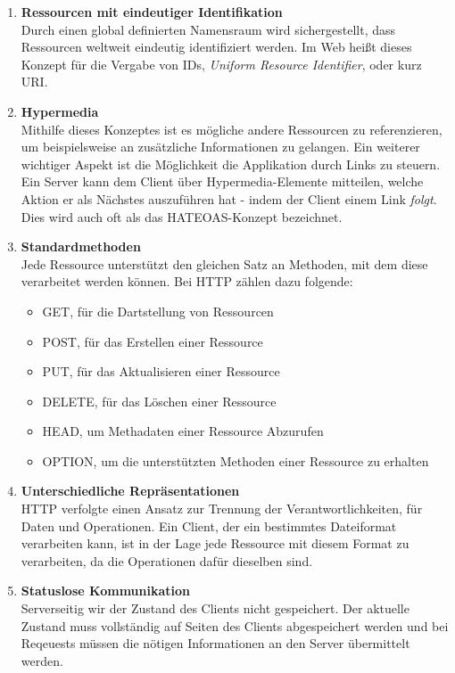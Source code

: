 \begin{enumerate}
	\item \textbf{Ressourcen mit eindeutiger Identifikation}\\
	Durch einen global definierten Namensraum wird sichergestellt, dass Ressourcen weltweit eindeutig identifiziert werden. Im Web heißt dieses Konzept für die Vergabe von IDs, \textit{Uniform Resource Identifier}, oder kurz URI. 
	
	\item \textbf{Hypermedia}\\
	Mithilfe dieses Konzeptes ist es mögliche andere Ressourcen zu referenzieren, um beispielsweise an zusätzliche Informationen zu gelangen. Ein weiterer wichtiger Aspekt ist die Möglichkeit die Applikation durch Links zu steuern. Ein Server kann dem Client über Hypermedia-Elemente mitteilen, welche Aktion er als Nächstes auszuführen hat - indem der Client einem Link \textit{folgt}. Dies wird auch oft als das \acrfull{HATEOAS}-Konzept bezeichnet. 
	
	\item \textbf{Standardmethoden}\\
	Jede Ressource unterstützt den gleichen Satz an Methoden, mit dem diese verarbeitet werden können. Bei HTTP zählen dazu folgende:
	\begin{itemize}
		\item GET, für die Dartstellung von Ressourcen
		\item POST, für das Erstellen einer Ressource
		\item PUT, für das Aktualisieren einer Ressource
		\item DELETE, für das Löschen einer Ressource
		\item HEAD, um Methadaten einer Ressource Abzurufen
		\item OPTION, um die unterstützten Methoden einer Ressource zu erhalten
	\end{itemize}
	
	\item \textbf{Unterschiedliche Repräsentationen}\\
	HTTP verfolgte einen Ansatz zur Trennung der Verantwortlichkeiten, für Daten und Operationen. Ein Client, der ein bestimmtes Dateiformat verarbeiten kann, ist in der Lage jede Ressource mit diesem Format zu verarbeiten, da die Operationen dafür dieselben sind. 
	
	\item \textbf{Statuslose Kommunikation}\\
	Serverseitig wir der Zustand des Clients nicht gespeichert. Der aktuelle Zustand muss vollständig auf Seiten des Clients abgespeichert werden und bei Reqeuests müssen die nötigen Informationen an den Server übermittelt werden.
	
\end{enumerate}

